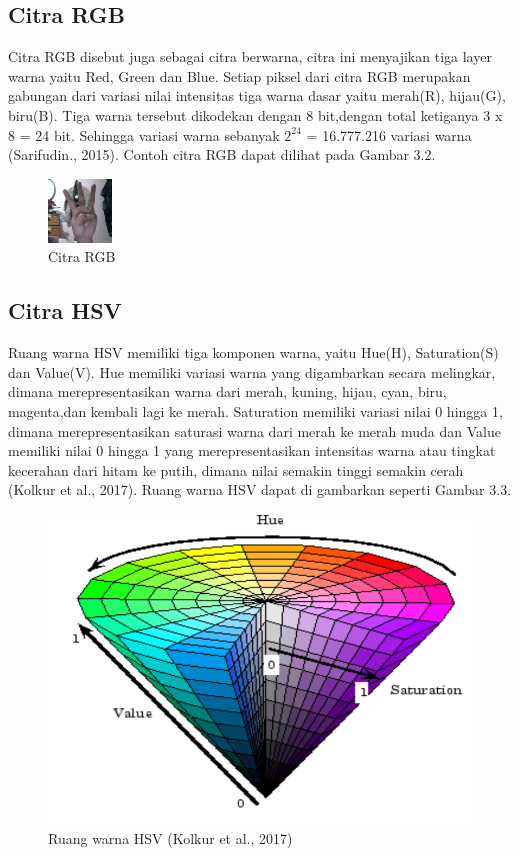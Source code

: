 \subsection{Citra RGB}
Citra RGB disebut juga sebagai citra berwarna, citra ini menyajikan tiga layer warna yaitu Red, Green dan Blue. Setiap piksel dari citra RGB merupakan gabungan dari variasi nilai intensitas tiga warna dasar yaitu merah(R), hijau(G), biru(B). Tiga warna tersebut dikodekan dengan 8 bit,dengan total ketiganya 3 x 8 = 24 bit. Sehingga variasi warna sebanyak $2^{24}$ = 16.777.216 variasi warna (Sarifudin., 2015). Contoh citra RGB dapat dilihat pada Gambar 3.2.
\begin{figure}[H]
	\centering
	\includegraphics[width=0.35\linewidth]{29}
	\caption{Citra RGB}
	\label{fig:29}
\end{figure}

\subsection{Citra HSV}
Ruang warna HSV memiliki tiga komponen warna, yaitu Hue(H), Saturation(S) dan Value(V).
Hue memiliki variasi warna yang digambarkan secara melingkar, dimana merepresentasikan warna dari merah, kuning, hijau, cyan, biru, magenta,dan kembali lagi ke merah.
Saturation memiliki variasi nilai 0 hingga 1, dimana merepresentasikan saturasi warna dari merah ke merah muda dan Value memiliki nilai 0 hingga 1 yang merepresentasikan intensitas warna atau tingkat kecerahan dari hitam ke putih, dimana nilai semakin tinggi semakin cerah (Kolkur et al., 2017).
Ruang warna HSV dapat di gambarkan seperti Gambar 3.3.
\begin{figure}
	\centering
	\includegraphics[width=0.45\linewidth]{hsv}
	\caption{Ruang warna HSV (Kolkur et al., 2017)}
	\label{fig:hsv}
\end{figure}

